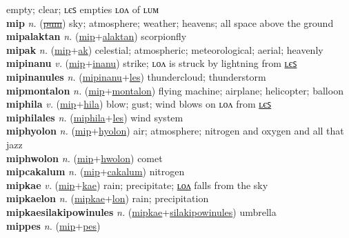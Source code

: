 empty; clear; ʟєꜱ empties ʟᴏᴧ of ʟᴜᴍ \label{mituki} \\
\textbf{mip} \textit{n.} (\hyperref[pum]{\sout{pum}})
sky; atmosphere; weather; heavens; all space above the ground \label{mip} \\
\textbf{mipalaktan} \textit{n.} (\hyperref[mip]{mip}+\hyperref[alaktan]{alaktan})
scorpionfly \label{mipalaktan} \\
\textbf{mipak} \textit{n.} (\hyperref[mip]{mip}+\hyperref[ak]{ak})
celestial; atmospheric; meteorological; aerial; heavenly \label{mipak} \\
\textbf{mipinanu} \textit{v.} (\hyperref[mip]{mip}+\hyperref[inanu]{inanu})
strike; ʟᴏᴧ is struck by lightning from \hyperref[mipinanules]{ʟєꜱ} \label{mipinanu} \\
\textbf{mipinanules} \textit{n.} (\hyperref[mipinanu]{mipinanu}+\hyperref[les]{les})
thundercloud; thunderstorm \label{mipinanules} \\
\textbf{mipmontalon} \textit{n.} (\hyperref[mip]{mip}+\hyperref[montalon]{montalon})
flying machine; airplane; helicopter; balloon \label{mipmontalon} \\
\textbf{miphila} \textit{v.} (\hyperref[mip]{mip}+\hyperref[hila]{hila})
blow; gust; wind blows on ʟᴏᴧ from \hyperref[miphilales]{ʟєꜱ} \label{miphila} \\
\textbf{miphilales} \textit{n.} (\hyperref[miphila]{miphila}+\hyperref[les]{les})
wind system \label{miphilales} \\
\textbf{miphyolon} \textit{n.} (\hyperref[mip]{mip}+\hyperref[hyolon]{hyolon})
air; atmosphere; nitrogen and oxygen and all that jazz \label{miphyolon} \\
\textbf{miphwolon} \textit{n.} (\hyperref[mip]{mip}+\hyperref[hwolon]{hwolon})
comet \label{miphwolon} \\
\textbf{mipcakalum} \textit{n.} (\hyperref[mip]{mip}+\hyperref[cakalum]{cakalum})
nitrogen \label{mipcakalum} \\
\textbf{mipkae} \textit{v.} (\hyperref[mip]{mip}+\hyperref[kae]{kae})
rain; precipitate; \hyperref[mipkaelon]{ʟᴏᴧ} falls from the sky \label{mipkae} \\
\textbf{mipkaelon} \textit{n.} (\hyperref[mipkae]{mipkae}+\hyperref[lon]{lon})
rain; precipitation \label{mipkaelon} \\
\textbf{mipkaesilakipowinules} \textit{n.} (\hyperref[mipkae]{mipkae}+\hyperref[silakipowinules]{silakipowinules})
umbrella \label{mipkaesilakipowinules} \\
\textbf{mippes} \textit{n.} (\hyperref[mip]{mip}+\hyperref[pes]{pes})
